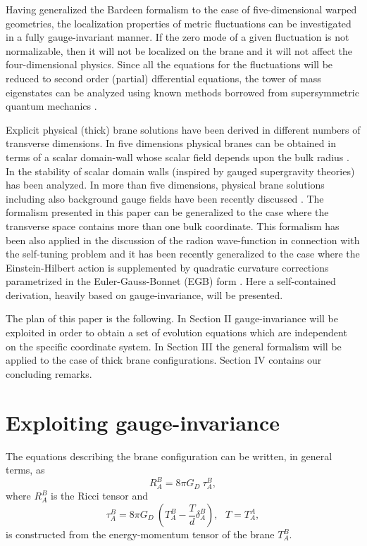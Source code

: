 \documentclass[a4paper,12pt]{article}
\begin{document}
Having generalized the Bardeen 
formalism to the case of five-dimensional warped geometries, 
the localization properties of metric 
fluctuations can be investigated in a fully gauge-invariant
manner. If the zero mode of a given fluctuation is 
not normalizable, then it will not be localized on the brane and 
it will not affect the four-dimensional physics. Since 
all the equations for the fluctuations will be reduced 
to second order (partial) dfferential equations, the tower 
of mass eigenstates can be analyzed using known methods 
borrowed from supersymmetric quantum mechanics \cite{susqm}.

Explicit physical (thick) brane solutions have  been derived 
in different numbers of transverse dimensions. In five dimensions 
physical branes can be obtained in terms  of a scalar domain-wall whose 
 scalar field depends upon the bulk radius \cite{kt1,kt2,gremm1,gremm2}. 
In \cite{free,free2} the stability of scalar domain walls (inspired by gauged 
supergravity theories) has been analyzed. 
In more than five dimensions, physical brane solutions including  also 
 background gauge fields have been recently discussed \cite{gms,gm}. 
The formalism presented in this paper can be generalized to the case 
where the transverse space contains more than one bulk coordinate. 
This formalism has been also applied in the 
discussion of the radion wave-function in connection 
with the self-tuning problem \cite{kim} and it has been 
recently generalized to the case where 
the Einstein-Hilbert 
action is supplemented by quadratic 
curvature corrections parametrized in the Euler-Gauss-Bonnet (EGB) 
form \cite{n3}. Here a self-contained derivation, heavily based 
on gauge-invariance, will be presented.

The plan of this paper is the following. In Section II 
 gauge-invariance will be exploited in order to obtain a set of 
evolution equations which are independent on the specific 
coordinate system. In Section III the general formalism 
will be applied to the case of thick brane configurations. Section IV contains 
our concluding remarks. 

\renewcommand{\theequation}{2.\arabic{equation}}
\setcounter{equation}{0}
\section{Exploiting gauge-invariance} 
The equations describing the brane configuration can be written, in 
general terms, as
\begin{equation}
R_{A}^{B} = 8 \pi G_{D} ~\tau_{A}^{B},
\label{ce}
\end{equation}
where $R_{A}^{B}$ is the Ricci tensor and 
\begin{equation}
\tau_{A}^{B} = 8 \pi G_{D}~(T_{A}^{B} - 
\frac{T}{d}\delta_{A}^{B}), \,\,\,\, T= T_{A}^{A},
\end{equation}
is constructed from the energy-momentum tensor of the brane $T_{A}^{B}$.
\end{document}

